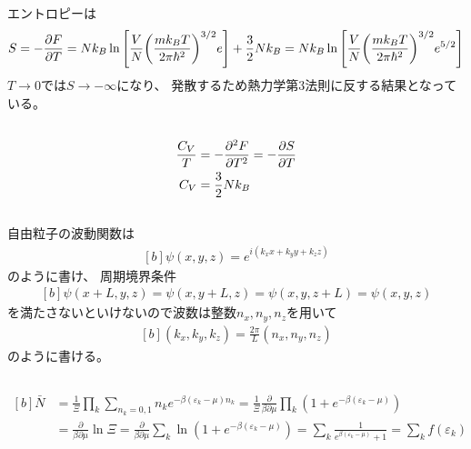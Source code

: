 \documentclass[../../sp_2019.tex]{subfiles}
\begin{document}
\subsection{}
エントロピーは
\begin{equation}\begin{aligned}[b]
    S = -\pdv{F}{T} = Nk_B\ln\qty[\frac{V}{N}\qty(\frac{mk_BT}{2\pi\hbar^2})^{3/2}e] + \frac{3}{2}Nk_B
    = Nk_B\ln\qty[\frac{V}{N}\qty(\frac{mk_BT}{2\pi\hbar^2})^{3/2}e^{5/2}]
\end{aligned}\end{equation}
\(T\to0\)では\(S\to -\infty\)になり、
発散するため熱力学第3法則に反する結果となっている。

\subsection{}
\begin{equation}\begin{aligned}[b]
    \frac{C_V}{T} &= -\pdv[2]{F}{T} = -\pdv{S}{T}\\
    C_V &=  \frac{3}{2}Nk_B
\end{aligned}\end{equation}

\subsection{}
自由粒子の波動関数は
\begin{equation}\begin{aligned}[b]
    \psi(x,y,z)=e^{i(k_xx+k_yy+k_zz)}
\end{aligned}\end{equation}
のように書け、
周期境界条件
\begin{equation}\begin{aligned}[b]
    \psi(x+L,y,z)=\psi(x,y+L,z)=\psi(x,y,z+L)=\psi(x,y,z)
\end{aligned}\end{equation}
を満たさないといけないので波数は整数\(n_x,n_y,n_z\)を用いて
\begin{equation}\begin{aligned}[b]
    (k_x,k_y,k_z)= \frac{2\pi}{L}(n_x,n_y,n_z)
\end{aligned}\end{equation}
のように書ける。

\subsection{}
\begin{equation}\begin{aligned}[b]
    \bar{N} &= \frac{1}{\Xi}\prod_k\sum_{n_k=0,1} n_ke^{-\beta(\varepsilon_k-\mu)n_k}
    = \frac{1}{\Xi}\frac{\partial}{\beta\partial\mu}\prod_k(1+e^{-\beta(\varepsilon_k-\mu)})\\
    &= \frac{\partial}{\beta\partial\mu}\ln\Xi
    = \frac{\partial}{\beta\partial\mu}\sum_k\ln(1+e^{-\beta(\varepsilon_k-\mu)})
    = \sum_k \frac{1}{e^{\beta(\varepsilon_k-\mu)}+1} = \sum_k f(\varepsilon_k)
\end{aligned}\end{equation}
\end{document}
